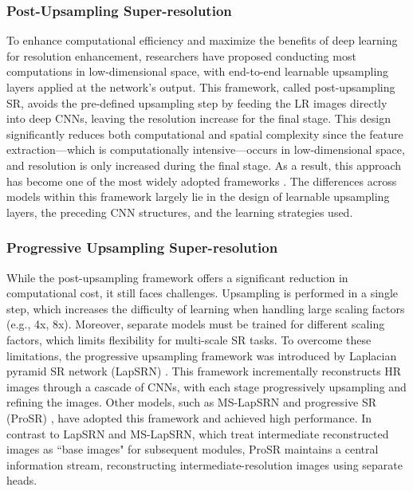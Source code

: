 \subsubsection{Post-Upsampling Super-resolution}
To enhance computational efficiency and maximize the benefits of deep learning for resolution enhancement, researchers have proposed conducting most computations in low-dimensional space, with end-to-end learnable upsampling layers applied at the network’s output. This framework, called post-upsampling SR, avoids the pre-defined upsampling step by feeding the LR images directly into deep CNNs, leaving the resolution increase for the final stage. This design significantly reduces both computational and spatial complexity since the feature extraction—which is computationally intensive—occurs in low-dimensional space, and resolution is only increased during the final stage. As a result, this approach has become one of the most widely adopted frameworks \cite{s10,s11,s12,s13}. The differences across models within this framework largely lie in the design of learnable upsampling layers, the preceding CNN structures, and the learning strategies used.
\subsubsection{Progressive Upsampling Super-resolution}
While the post-upsampling framework offers a significant reduction in computational cost, it still faces challenges. Upsampling is performed in a single step, which increases the difficulty of learning when handling large scaling factors (e.g., 4x, 8x). Moreover, separate models must be trained for different scaling factors, which limits flexibility for multi-scale SR tasks. To overcome these limitations, the progressive upsampling framework was introduced by Laplacian pyramid SR network (LapSRN) \cite{s14}. This framework incrementally reconstructs HR images through a cascade of CNNs, with each stage progressively upsampling and refining the images. Other models, such as MS-LapSRN \cite{s15} and progressive SR (ProSR) \cite{s16}, have adopted this framework and achieved high performance. In contrast to LapSRN and MS-LapSRN, which treat intermediate reconstructed images as ``base images" for subsequent modules, ProSR maintains a central information stream, reconstructing intermediate-resolution images using separate heads.

